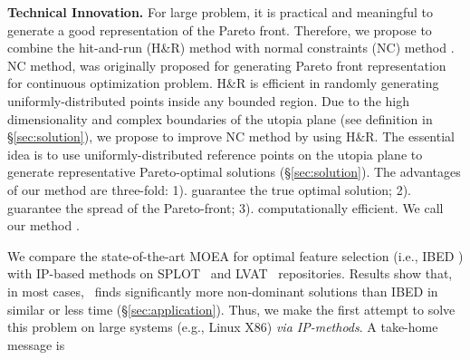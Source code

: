 \textbf{Technical Innovation.} For large problem, it is practical and meaningful to generate a good representation of the Pareto front. Therefore, we propose to combine the hit-and-run (H\&R)  method \cite{DBLP:journals/ior/Smith84} with normal constraints (NC) method \cite{normalCons}. NC method, was originally proposed for generating Pareto front representation for continuous optimization problem. %
H\&R is efficient in randomly generating uniformly-distributed points inside any bounded region. Due to the high dimensionality and complex boundaries of the utopia plane (see definition in \S\ref{sec:solution}), we propose  to improve NC method by using H\&R. %
The essential idea is to use uniformly-distributed reference points on the utopia plane to generate representative Pareto-optimal solutions (\S\ref{sec:solution}). The advantages of our method are three-fold: 1). guarantee the true optimal solution; 2). guarantee the spread of the Pareto-front; 3). computationally efficient. We call our method \ourSol. %




We compare the state-of-the-art MOEA for optimal feature selection (i.e., IBED \cite{DBLP:journals/asc/XueZT0CC016}) with IP-based methods on SPLOT~\cite{DBLP:conf/oopsla/MendoncaBC091} and LVAT~\cite{LVAT} repositories. Results show that, in most cases,  \ourSol~finds significantly more non-dominant solutions than IBED in similar or less time (\S\ref{sec:application}). Thus, we make the first attempt to solve this problem on large systems (e.g., Linux X86) \emph{via IP-methods}. A take-home message is  %

